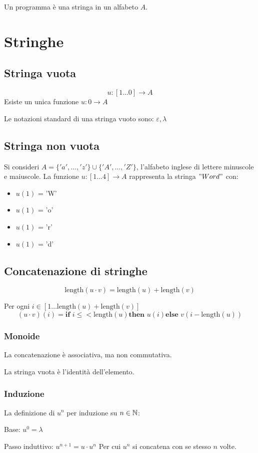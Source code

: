 \begin{theorem}
\begin{theorem}
  Un programma è una stringa in un alfabeto $A$.
\end{theorem}

\section{Stringhe}
\subsection{Stringa vuota}
\[u: [1\dots0] \rightarrow A\]
Esiste un unica funzione $u: 0\rightarrow A$

Le notazioni standard di una stringa vuoto sono: $\varepsilon, \lambda$

\subsection{Stringa non vuota}
Si consideri $A=\{'a',\dots,'z'\}\cup\{'A',\dots,'Z'\}$, l'alfabeto inglese
di lettere minuscole e maiuscole.
La funzione $u:[1\dots4]\rightarrow A$ rappresenta la stringa $"Word"$ con:
\begin{itemize}
  \item $u(1)$ = 'W'
  \item $u(1)$ = 'o'
  \item $u(1)$ = 'r'
  \item $u(1)$ = 'd'
\end{itemize}

\subsection{Concatenazione di stringhe}
\begin{theorem}
  \[\text{length}(u\cdot v) = \text{length}(u) + \text{length}(v)\]
  
  Per ogni $i\in[1\dots \text{length}(u) + \text{length}(v)]$
  \[ (u\cdot v)(i) = \textbf{if } i\leq<\text{length}(u) \textbf{then } u(i)
  \textbf{else } v(i-\text{length}(u))\]
\end{theorem}
\subsubsection{Monoide}
La concatenazione è associativa, ma non commutativa.

La stringa vuota è l'identità dell'elemento.
\subsubsection{Induzione}
La definizione di $u^n$ per induzione su $n \in \mathbb{N}$:

Base: $u^0 = \lambda$

Passo induttivo: $u^{n+1} = u \cdot u^n$
Per cui $u^n$ si concatena con se stesso $n$ volte.
\end{theorem}
